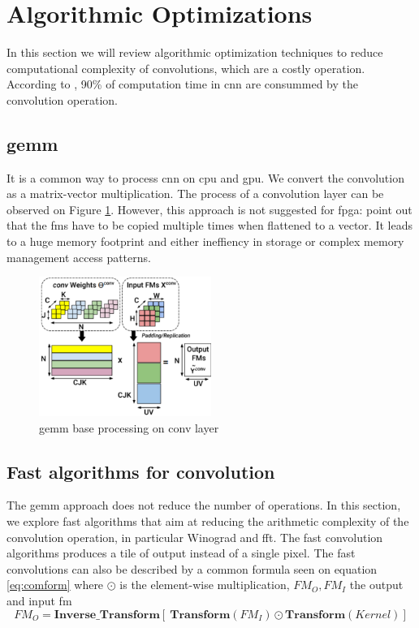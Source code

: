 \section{Algorithmic Optimizations} \label{sec:algopti}
In this section we will review algorithmic optimization techniques to reduce computational complexity of convolutions, which are a costly operation. According to \cite{shawahna_fpga-based_2019}, 90\% of computation time in \acrshort{cnn} are consummed by the convolution operation.
%
%
\subsection{\acrfull{gemm}}
%
%
It is a common way to process \acrshort{cnn} on \acrshort{cpu} and \acrshort{gpu}. We convert the convolution as a matrix-vector multiplication.  The process of a convolution layer can be observed on Figure \ref{fig:gemm}.
However, this approach is not suggested for \acrshort{fpga}: \cite{sze_efficient_2017, zhu_efficient_2020} point out that the \acrshort{fm}s have to be copied multiple times when flattened to a vector. It leads to a huge memory footprint and either ineffiency in storage or complex memory management access patterns.
\begin{figure}
    \centering
    \includegraphics[width=0.5\textwidth]{Images/gemm.pdf}
    \caption{\acrshort{gemm} base processing on conv layer}
    \label{fig:gemm}
\end{figure}
%
%
\subsection{Fast algorithms for convolution}
The \acrshort{gemm} approach does not reduce the number of operations. In this section, we explore fast algorithms that aim at reducing the arithmetic complexity of the convolution operation, in particular Winograd and \acrfull{fft}. The fast convolution algorithms produces a tile of output instead of a single pixel. The fast convolutions can also be described by a common formula seen on equation \ref{eq:comform} where $\odot$ is the element-wise multiplication, $FM_O, FM_I$ the output and input \acrshort{fm}
\begin{equation}
FM_O = \boldsymbol{Inverse\_Transform} [ \ \boldsymbol{Transform}(FM_I) \odot \boldsymbol{Transform}(Kernel) ]
\label{eq:comform}
\end{equation}
%
